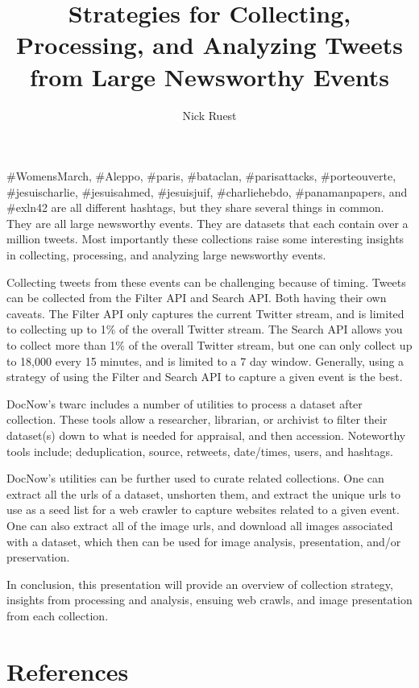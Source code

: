\documentclass[sigconf]{acmart}
\begin{document}
\title{Strategies for Collecting, Processing, and Analyzing Tweets from Large Newsworthy Events}

\author{Nick Ruest}



\maketitle

\#WomensMarch, \#Aleppo, \#paris, \#bataclan, \#parisattacks, \#porteouverte, \#jesuischarlie, \#jesuisahmed, \#jesuisjuif, \#charliehebdo, \#panamanpapers, and \#exln42 are all different hashtags, but they share several things in common. They are all large newsworthy events. They are datasets that each contain over a million tweets. Most importantly these collections raise some interesting insights in collecting, processing, and analyzing large newsworthy events\cite{Milligan_etal_JCDL2016}.
 
Collecting tweets from these events can be challenging because of timing. Tweets can be collected from the Filter API\cite{twitter_filter} and Search API\cite{twitter_search}. Both having their own caveats. The Filter API only captures the current Twitter stream, and is limited to collecting up to 1\% of the overall Twitter stream. The Search API allows you to collect more than 1\% of the overall Twitter stream\cite{Driscoll_etal_IJC2014}, but one can only collect up to 18,000 every 15 minutes, and is limited to a 7 day window. Generally, using a strategy of using the Filter and Search API to capture a given event is the best.
 
DocNow's twarc\cite{summers_twarc_2015} includes a number of utilities to process a dataset after collection. These tools allow a researcher, librarian, or archivist to filter their dataset(s) down to what is needed for appraisal, and then accession. Noteworthy tools include; deduplication, source, retweets, date/times, users, and hashtags.
 
DocNow's utilities can be further used to curate related collections. One can extract all the urls of a dataset, unshorten them, and extract the unique urls to use as a seed list for a web crawler to capture websites related to a given event. One can also extract all of the image urls, and download all images associated with a dataset, which then can be used for image analysis\cite{ruest_2016}, presentation, and/or preservation.
 
In conclusion, this presentation will provide an overview of collection strategy, insights from processing and analysis, ensuing web crawls, and image presentation from each collection. 

\section{References}


 
\end{document}
